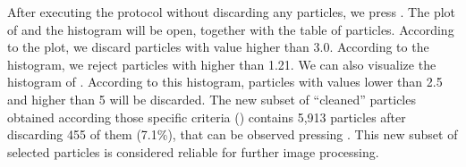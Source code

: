   After executing the protocol without discarding any particles, we press . The plot of  and the  histogram will be open, together with the table of particles. According to the  plot, we discard particles with  value higher than 3.0. According to the  histogram, we reject particles with  higher than 1.21. We can also visualize the histogram of . According to this histogram, particles with  values lower than 2.5 and higher than 5 will be discarded. The new subset of ``cleaned'' particles  obtained according those specific criteria () contains 5,913 particles after discarding 455 of them (7.1\%), that can be observed pressing . This new subset of selected particles is considered reliable for further image processing.
